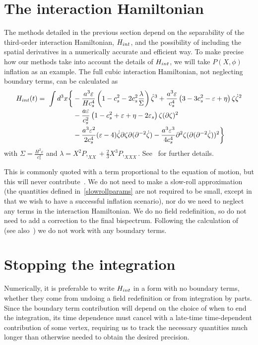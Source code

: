 \section{The interaction Hamiltonian}\label{sec:h_int}
The methods detailed in the previous section depend on the separability of
the third-order interaction Hamiltonian, $H_{int}$,
and the possibility of including the spatial derivatives in a
numerically accurate and efficient way.
To make precise how our methods take into account the details of
$H_{int}$, we will take $P(X,\phi)$ inflation as an example.
The full cubic interaction Hamiltonian, not neglecting boundary terms,
can be calculated as~\cite{px_burrage,chen_ng_0605,seery_ng_0503}
\begin{align}
    H_{int}(t)=\ \int d^3x\bigg\{& -\frac{a^3\varepsilon}{H c_s^4}\left(1-c_s^{2}-2c_s^{2}\frac{\lambda}{\Sigma}\right)\dot{\zeta}^3
		+ \frac{a^3\varepsilon}{c_s^{4}}\left(3-3c_s^2-\varepsilon+\eta\right) \zeta\dot{\zeta}^2\nonumber\\
		&- \frac{a\varepsilon}{c_s^{2}}\left(1-c_s^2+\varepsilon+\eta-2\varepsilon_s\right) \zeta(\partial\zeta)^2\nonumber\\
        &- \frac{a^3\varepsilon^2}{2c_s^{4}}(\varepsilon-4)\dot{\zeta}\partial\zeta\partial(\partial^{-2}\dot{\zeta})
        - \frac{a^3\varepsilon^3}{4c_s^4}\partial^2\zeta(\partial(\partial^{-2}\dot{\zeta}))^2\bigg\}\label{interaction_loc}
\end{align}
with $\Sigma=\frac{H^2\varepsilon}{c^2_s}$
and $\lambda = X^2P,_{XX}+\frac{2}{3}X^3P,_{XXX}$.
See~\cite{px_burrage} for further details.


This is commonly quoted with a term proportional to the equation of motion,
but this will never contribute~\cite{px_burrage,bdy_arroja,bdy_passaglia,bdy_rigopoulos}.
We do not need to make a slow-roll approximation
(the quantities defined in~\eqref{slowrollparams} are not required to be small,
except in that we wish to have a successful inflation scenario),
nor do we need to neglect any terms in the interaction Hamiltonian.
We do no field redefinition,
so do not need to add a correction to the final bispectrum.
Following the calculation of~\cite{px_burrage} (see also~\cite{bdy_arroja,bdy_passaglia,bdy_rigopoulos})
we do not work with any boundary terms.


\section{Stopping the integration}\label{sec:stopping}
Numerically, it is preferable to write $H_{int}$ in a form with no boundary terms,
whether they come from undoing a field redefinition or from integration by parts.
Since the boundary term contribution will depend on the choice of when to end the integration,
its time dependence must cancel with a late-time time-dependent
contribution of some vertex, requiring us to track the necessary quantities
much longer than otherwise needed to obtain the desired precision.

